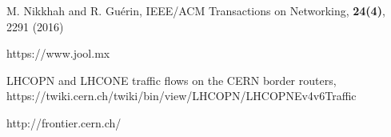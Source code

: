 \begin{thebibliography}{}




M. Nikkhah and R. Gu\'erin, 
IEEE/ACM Transactions on Networking, {\bf 24(4)}, 2291 (2016)

https://www.jool.mx


LHCOPN and LHCONE traffic flows on the CERN border routers, 
https://twiki.cern.ch/twiki/bin/view/LHCOPN/LHCOPNEv4v6Traffic


http://frontier.cern.ch/








\end{thebibliography}
